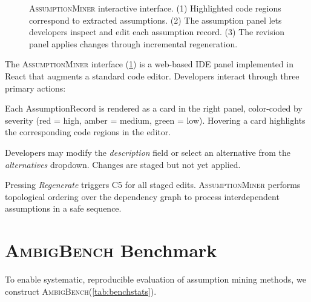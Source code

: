 \documentclass[sigconf,review,anonymous]{acmart}
\newcommand{\sysname}{\textsc{AssumptionMiner}\xspace}
\newcommand{\benchname}{\textsc{AmbigBench}\xspace}
\begin{document}
\begin{figure}[t]
{}%
  \caption{\sysname interactive interface.  (1) Highlighted code regions correspond
           to extracted assumptions.  (2) The assumption panel lets developers inspect
           and edit each assumption record.  (3) The revision panel applies changes
           through incremental regeneration.}
  \label{fig:ui}
\end{figure}

The \sysname interface (\cref{fig:ui}) is a web-based IDE panel implemented in
React that augments a standard code editor.  Developers interact through three
primary actions:

\begin{description}[noitemsep, leftmargin=1em]
  \item[\textbf{Inspect.}]  Each AssumptionRecord is rendered as a card in the
       right panel, color-coded by severity (red = high, amber = medium,
       green = low).  Hovering a card highlights the corresponding code regions
       in the editor.

  \item[\textbf{Edit.}]  Developers may modify the \emph{description} field or
       select an alternative from the \emph{alternatives} dropdown.
       Changes are staged but not yet applied.

  \item[\textbf{Regenerate.}]  Pressing \emph{Regenerate} triggers C5 for all
       staged edits.  \sysname performs topological ordering over the dependency
       graph to process interdependent assumptions in a safe sequence.
\end{description}

\section{\benchname Benchmark}
\label{sec:benchmark}

To enable systematic, reproducible evaluation of assumption mining methods, we
construct \benchname (\cref{tab:benchstats}).
\end{document}

